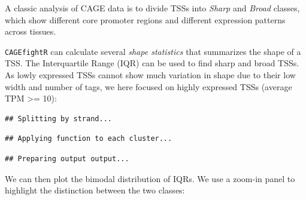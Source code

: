 \documentclass[9pt,a4paper,]{extarticle}
\newenvironment{Shaded}{\begin{snugshade}}{\end{snugshade}}
\newcommand{\KeywordTok}[1]{\textcolor[rgb]{0.13,0.29,0.53}{\textbf{{#1}}}}
\newcommand{\DataTypeTok}[1]{\textcolor[rgb]{0.13,0.29,0.53}{{#1}}}
\newcommand{\DecValTok}[1]{\textcolor[rgb]{0.00,0.00,0.81}{{#1}}}
\newcommand{\FloatTok}[1]{\textcolor[rgb]{0.00,0.00,0.81}{{#1}}}
\newcommand{\StringTok}[1]{\textcolor[rgb]{0.31,0.60,0.02}{{#1}}}
\newcommand{\CommentTok}[1]{\textcolor[rgb]{0.56,0.35,0.01}{\textit{{#1}}}}
\newcommand{\NormalTok}[1]{{#1}}
\begin{document}
A classic analysis of CAGE data is to divide TSSs into \emph{Sharp} and \emph{Broad} classes, which show different core promoter regions and different expression patterns across tissues\citep{Carninci2006}.

\texttt{CAGEfightR} can calculate several \emph{shape statistics} that summarizes the shape of a TSS. The Interquartile Range (IQR) can be used to find sharp and broad TSSs. As lowly expressed TSSs cannot show much variation in shape due to their low width and number of tags, we here focused on highly expressed TSSs (average TPM \textgreater{}= 10):

\begin{Shaded}
\end{Shaded}

\begin{verbatim}
## Splitting by strand...
\end{verbatim}

\begin{verbatim}
## Applying function to each cluster...
\end{verbatim}

\begin{verbatim}
## Preparing output output...
\end{verbatim}

We can then plot the bimodal distribution of IQRs. We use a zoom-in panel to highlight the distinction between the two classes:
\end{document}
